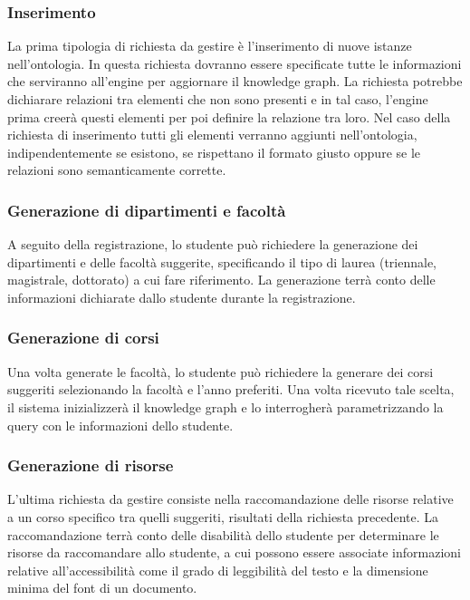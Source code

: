 \subsubsection{Inserimento}
La prima tipologia di richiesta da gestire è l’inserimento di nuove istanze nell'ontologia. In questa richiesta dovranno essere specificate tutte le informazioni che serviranno all’engine per aggiornare il knowledge graph. La richiesta potrebbe dichiarare relazioni tra elementi che non sono presenti e in tal caso, l’engine prima creerà questi elementi per poi definire la relazione tra
loro. Nel caso della richiesta di inserimento tutti gli elementi verranno aggiunti nell’ontologia, indipendentemente se esistono, se rispettano il formato giusto oppure se le relazioni sono semanticamente corrette.

\subsubsection{Generazione di dipartimenti e facoltà}
A seguito della registrazione, lo studente può richiedere la generazione dei dipartimenti e delle facoltà suggerite, specificando il tipo di laurea (triennale, magistrale, dottorato) a cui fare riferimento. La generazione terrà conto delle informazioni dichiarate dallo studente durante la registrazione.

\subsubsection{Generazione di corsi}
Una volta generate le facoltà, lo studente può richiedere la generare dei corsi suggeriti selezionando la facoltà e l'anno preferiti. 
Una volta ricevuto tale scelta, il sistema inizializzerà il knowledge graph e lo interrogherà parametrizzando la query con le informazioni dello studente.

\subsubsection{Generazione di risorse}
L'ultima richiesta da gestire consiste nella raccomandazione delle risorse relative a un corso specifico tra quelli suggeriti, risultati della richiesta precedente.
La raccomandazione terrà conto delle disabilità dello studente per determinare le risorse da raccomandare allo studente, a cui possono essere associate informazioni relative all'accessibilità come il grado di leggibilità del testo e la dimensione minima del font di un documento.

